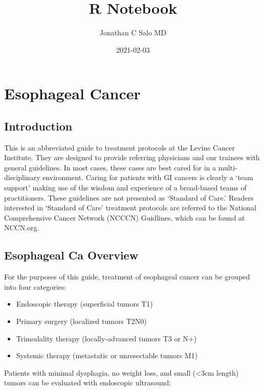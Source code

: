 \documentclass[
]{book}
\title{R Notebook}
\author{Jonathan C Salo MD}
\date{2021-02-03}
\providecommand{\tightlist}{%
  \setlength{\itemsep}{0pt}\setlength{\parskip}{0pt}}
\begin{document}
\maketitle

{
\setcounter{tocdepth}{1}
\tableofcontents
}
\hypertarget{part-esophageal-cancer}{%
\part*{Esophageal Cancer}\label{part-esophageal-cancer}}

\hypertarget{introduction}{%
\chapter*{Introduction}\label{introduction}}

This is an abbreviated guide to treatment protocols at the Levine Cancer Institute. They are designed to provide referring physicians and our trainees with general guidelines. In most cases, these cases are best cared for in a multi-disciplinary environment. Caring for patients with GI cancers is clearly a `team support' making use of the wisdom and experience of a broad-based teams of practitioners. These guidelines are not presented as `Standard of Care.' Readers interested in `Standard of Care' treatment protocols are referred to the National Comprehensive Cancer Network (NCCCN) Guidlines, which can be found at NCCN.org.

\hypertarget{EsoIntro}{%
\chapter{Esophageal Ca Overview}\label{EsoIntro}}

For the purposes of this guide, treatment of esophageal cancer can be grouped into four categories:

\begin{itemize}
\tightlist
\item
  Endoscopic therapy (superficial tumors T1)
\item
  Primary surgery (localized tumors T2N0)
\item
  Trimodality therapy (locally-advanced tumors T3 or N+)
\item
  Systemic therapy (metastatic or unresectable tumors M1)
\end{itemize}

Patients with minimal dysphagia, no weight loss, and small (\textless3cm length) tumors can be evaluated with endoscopic ultrasound:
\end{document}
